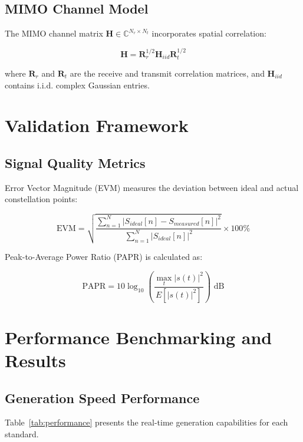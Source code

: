 \documentclass[twocolumn,10pt]{article}
\begin{document}
\subsection{MIMO Channel Model}

The MIMO channel matrix $\mathbf{H} \in \mathbb{C}^{N_r \times N_t}$ incorporates spatial correlation:

\begin{equation}
\mathbf{H} = \mathbf{R}_r^{1/2} \mathbf{H}_{iid} \mathbf{R}_t^{1/2}
\end{equation}

where $\mathbf{R}_r$ and $\mathbf{R}_t$ are the receive and transmit correlation matrices, and $\mathbf{H}_{iid}$ contains i.i.d. complex Gaussian entries.

\section{Validation Framework}

\subsection{Signal Quality Metrics}

Error Vector Magnitude (EVM) measures the deviation between ideal and actual constellation points:

\begin{equation}
\text{EVM} = \sqrt{\frac{\sum_{n=1}^{N} |S_{ideal}[n] - S_{measured}[n]|^2}{\sum_{n=1}^{N} |S_{ideal}[n]|^2}} \times 100\%
\end{equation}

Peak-to-Average Power Ratio (PAPR) is calculated as:

\begin{equation}
\text{PAPR} = 10\log_{10}\left(\frac{\max_{t}|s(t)|^2}{E[|s(t)|^2]}\right) \text{ dB}
\end{equation}

\section{Performance Benchmarking and Results}

\subsection{Generation Speed Performance}

Table~\ref{tab:performance} presents the real-time generation capabilities for each standard.
\end{document}
